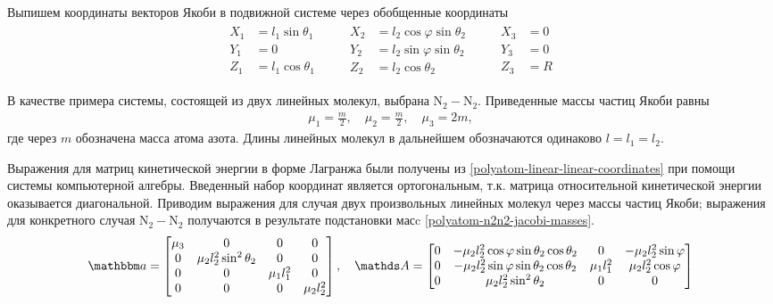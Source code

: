 Выпишем координаты векторов Якоби в подвижной системе через обобщенные координаты 
\begin{gather}
    \begin{aligned}
        X_1 &= l_1 \sin \theta_1 \\
        Y_1 &= 0 \\
        Z_1 &= l_1 \cos \theta_1 
    \end{aligned} \qquad
    \begin{aligned}
        X_2 &= l_2 \cos \varphi \sin \theta_2 \\
        Y_2 &= l_2 \sin \varphi \sin \theta_2 \\
        Z_2 &= l_2 \cos \theta_2
    \end{aligned} \qquad
    \begin{aligned}
        X_3 &= 0 \\
        Y_3 &= 0 \\
        Z_3 &= R
    \end{aligned} \label{polyatom-linear-linear-coordinates}
\end{gather}

В качестве примера системы, состоящей из двух линейных молекул, выбрана N$_2-$N$_2$. Приведенные массы частиц Якоби равны
\begin{gather}
    \mu_1 = \frac{m}{2}, \quad \mu_2 = \frac{m}{2}, \quad \mu_3 = 2m, \label{polyatom-n2n2-jacobi-masses}
\end{gather}
%
где через $m$ обозначена масса атома азота. Длины линейных молекул в дальнейшем обозначаются одинаково $l = l_1 = l_2$.

Выражения для матриц кинетической энергии в форме Лагранжа были получены из \eqref{polyatom-linear-linear-coordinates} при помощи системы компьютерной алгебры. Введенный набор координат является ортогональным, т.к. матрица относительной кинетической энергии оказывается диагональной. Приводим выражения для случая двух произвольных линейных молекул через массы частиц Якоби; выражения для конкретного случая N$_2-$N$_2$ получаются в результате подстановки масc \eqref{polyatom-n2n2-jacobi-masses}.  
\begin{gather}
\bba = 
\begin{bmatrix}
\mu_3 & 0 & 0 & 0 \\
0 & \mu_2 l_2^2 \sin^2 \theta_2 & 0 & 0 \\
0 & 0 & \mu_1 l_1^2 & 0 \\
0 & 0 & 0 & \mu_2 l_2^2 \\ 
\end{bmatrix}, \quad  
\bbA = 
\begin{bmatrix}
0 & -\mu_2 l_2^2 \cos \varphi \sin \theta_2 \cos \theta_2 & 0 & -\mu_2 l_2^2 \sin \varphi  \\
0 & -\mu_2 l_2^2 \sin \varphi \sin \theta_2 \cos \theta_2 & \mu_1 l_1^2 & \mu_2 l_2^2 \cos \varphi \\
0 &  \mu_2 l_2^2 \sin^2 \theta_2 & 0 & 0
\end{bmatrix} \notag 
\end{gather}

